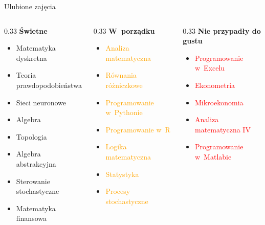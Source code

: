 \documentclass{beamer}
\begin{document}
\begin{frame}{Ulubione zajęcia}
  \small
  \begin{columns}[T]
    \begin{column}{0.33\textwidth}
      \textbf{Świetne}
      \begin{itemize}
        \item \textcolor{green!70!black}{Matematyka dyskretna}
        \item \textcolor{green!70!black}{Teoria prawdopodobieństwa}
        \item \textcolor{green!70!black}{Sieci neuronowe}
        \item \textcolor{green!70!black}{Algebra}
        \item \textcolor{green!70!black}{Topologia}
        \item \textcolor{green!70!black}{Algebra abstrakcyjna}
        \item \textcolor{green!70!black}{Sterowanie stochastyczne}
        \item \textcolor{green!70!black}{Matematyka finansowa}
      \end{itemize}
    \end{column}
    \begin{column}{0.33\textwidth}
      \textbf{W~porządku}
      \begin{itemize}
        \item \textcolor{orange}{Analiza matematyczna}
        \item \textcolor{orange}{Równania różniczkowe}
        \item \textcolor{orange}{Programowanie w~Pythonie}
        \item \textcolor{orange}{Programowanie w~R}
        \item \textcolor{orange}{Logika matematyczna}
        \item \textcolor{orange}{Statystyka}
        \item \textcolor{orange}{Procesy stochastyczne}
      \end{itemize}
    \end{column}
    \begin{column}{0.33\textwidth}
      \textbf{Nie przypadły do gustu}
      \begin{itemize}
        \item \textcolor{red}{Programowanie w~Excelu}
        \item \textcolor{red}{Ekonometria}
        \item \textcolor{red}{Mikroekonomia}
        \item \textcolor{red}{Analiza matematyczna IV}
        \item \textcolor{red}{Programowanie w~Matlabie}
      \end{itemize}
    \end{column}
  \end{columns}
\end{frame}
\end{document}
